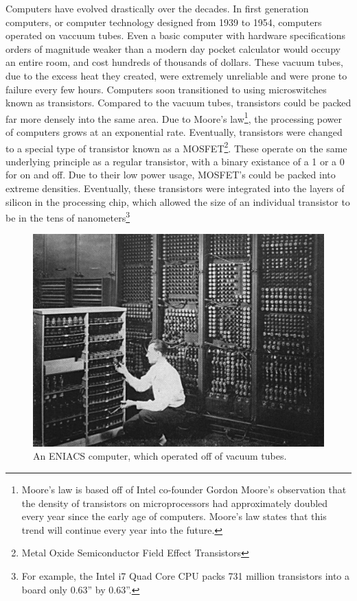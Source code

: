 \documentclass[10pt,journal,compsoc]{IEEEtran}
\begin{document}
Computers have evolved drastically over the decades. In first generation computers, or computer technology designed from 1939 to 1954, computers operated on vaccuum tubes. Even a basic computer with hardware specifications orders of magnitude weaker than a modern day pocket calculator would occupy an entire room, and cost hundreds of thousands of dollars.
These vacuum tubes, due to the excess heat they created, were extremely unreliable and were prone to failure every few hours. Computers soon transitioned to using microswitches known as transistors.  Compared to the vacuum tubes, transistors could be packed far more densely into the same area. Due to Moore's law\footnote{Moore's law is based off of Intel co-founder Gordon Moore's observation that the density of transistors on microprocessors had approximately doubled every year since the early age of computers. Moore's law states that this trend will continue every year into the future.}, the processing power of computers grows at an exponential rate. Eventually, transistors were changed to a special type of transistor known as a MOSFET\footnote{Metal Oxide Semiconductor Field Effect Transistors}. These operate on the same underlying principle as a regular transistor, with a binary existance of a 1 or a 0 for on and off. Due to their low power usage, MOSFET's could be packed into extreme densities. Eventually, these transistors were integrated into the layers of silicon in the processing chip, which allowed the size of an individual transistor to be in the tens of nanometers\footnote{For example, the Intel i7 Quad Core CPU packs 731 million transistors into a board only 0.63'' by 0.63''.}
\begin{figure}
\centering
\includegraphics[width=0.7\linewidth]{eniacsvacuum}
\caption[]{An ENIACS computer, which operated off of vacuum tubes.}
\label{fig:eniacsvacuum}
\end{figure}
\end{document}
